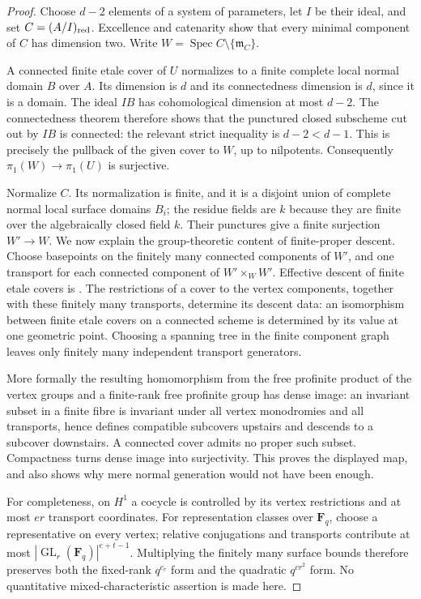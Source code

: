 \begin{proof}
Choose $d-2$ elements of a system of parameters, let $I$ be their ideal,
and set $C=(A/I)_{\rm red}$. Excellence and catenarity show that every
minimal component of $C$ has dimension two. Write
$W=\operatorname{Spec}C\setminus\{\mathfrak m_C\}$.

A connected finite etale cover of $U$ normalizes to a finite complete
local normal domain $B$ over $A$. Its dimension is $d$ and its
connectedness dimension is $d$, since it is a domain. The ideal $IB$
has cohomological dimension at most $d-2$. The connectedness theorem
\citep[Tag 0ECR, with Tag 0DX9]{C_StacksLocalSlice} therefore shows
that the punctured closed subscheme cut out by $IB$ is connected:
the relevant strict inequality is $d-2<d-1$. This is precisely the
pullback of the given cover to $W$, up to nilpotents. Consequently
$\pi_1(W)\to\pi_1(U)$ is surjective.

Normalize $C$. Its normalization is finite, and it is a disjoint union
of complete normal local surface domains $B_i$; the residue fields are
$k$ because they are finite over the algebraically closed field $k$.
Their punctures give a finite surjection $W'\to W$. We now explain the
group-theoretic content of finite-proper descent. Choose basepoints on
the finitely many connected components of $W'$, and one transport for
each connected component of $W'\times_W W'$. Effective descent of finite
etale covers is \citet[Expose IX, Theorem 4.7]{C_SGA1}. The restrictions
of a cover to the vertex components, together with these finitely many
transports, determine its descent data: an isomorphism between finite
etale covers on a connected scheme is determined by its value at one
geometric point. Choosing a spanning tree in the finite component graph
leaves only finitely many independent transport generators.

More formally the resulting homomorphism from the free profinite product
of the vertex groups and a finite-rank free profinite group has dense
image: an invariant subset in a finite fibre is invariant under all
vertex monodromies and all transports, hence defines compatible
subcovers upstairs and descends to a subcover downstairs. A connected
cover admits no proper such subset. Compactness turns dense image into
surjectivity. This proves the displayed map, and also shows why mere
normal generation would not have been enough.

For completeness, on $H^1$ a cocycle is controlled by its vertex
restrictions and at most $er$ transport coordinates. For representation
classes over $\mathbf F_q$, choose a representative on every vertex;
relative conjugations and transports contribute at most
$|\operatorname{GL}_r(\mathbf F_q)|^{e+t-1}$. Multiplying the finitely
many surface bounds therefore preserves both the fixed-rank
$q^{c_r}$ form and the quadratic $q^{cr^2}$ form. No quantitative
mixed-characteristic assertion is made here.
\end{proof}
